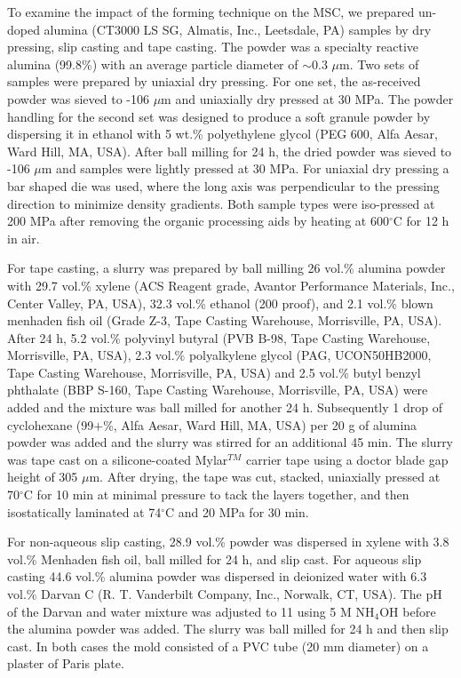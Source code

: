 To examine the impact of the forming technique on the MSC, we prepared un-doped alumina (CT3000 LS SG, Almatis, Inc., Leetsdale, PA) samples by dry pressing, slip casting and tape casting. The powder was a specialty reactive alumina (99.8\%) with an average particle diameter of $\sim$0.3 $\mu$m. Two sets of samples were prepared by uniaxial dry pressing. For one set, the as-received powder was sieved to -106 $\mu$m and uniaxially dry pressed at 30 MPa. The powder handling for the second set was designed to produce a soft granule powder by dispersing it in ethanol with 5 wt.\% polyethylene glycol (PEG 600, Alfa Aesar, Ward Hill, MA, USA). After ball milling for 24 h, the dried powder was sieved to -106 $\mu$m and samples were lightly pressed at 30 MPa. For uniaxial dry pressing a bar shaped die was used, where the long axis was perpendicular to the pressing direction to minimize density gradients. Both sample types were iso-pressed at 200 MPa after removing the organic processing aids by heating at 600$^{\circ}$C for 12 h in air.

For tape casting, a slurry was prepared by ball milling 26 vol.\% alumina powder with 29.7 vol.\% xylene (ACS Reagent grade, Avantor Performance Materials, Inc., Center Valley, PA, USA), 32.3 vol.\% ethanol (200 proof), and 2.1 vol.\% blown menhaden fish oil (Grade Z-3, Tape Casting Warehouse, Morrisville, PA, USA). After 24 h, 5.2 vol.\% polyvinyl butyral (PVB B-98, Tape Casting Warehouse, Morrisville, PA, USA), 2.3 vol.\% polyalkylene glycol (PAG, UCON50HB2000, Tape Casting Warehouse, Morrisville, PA, USA) and 2.5 vol.\% butyl benzyl phthalate (BBP S-160, Tape Casting Warehouse, Morrisville, PA, USA) were added and the mixture was ball milled for another 24 h. Subsequently 1 drop of cyclohexane (99$+$\%, Alfa Aesar, Ward Hill, MA, USA) per 20 g of alumina powder was added and the slurry was stirred for an additional 45 min. The slurry was tape cast on a silicone-coated Mylar$^{TM}$ carrier tape using a doctor blade gap height of 305 $\mu$m. After drying, the tape was cut, stacked, uniaxially pressed at 70$^{\circ}$C for 10 min at minimal pressure to tack the layers together, and then isostatically laminated at 74$^{\circ}$C and 20 MPa for 30 min.

For non-aqueous slip casting, 28.9 vol.\% powder was dispersed in xylene with 3.8 vol.\% Menhaden fish oil, ball milled for 24 h, and slip cast. For aqueous slip casting 44.6 vol.\% alumina powder was dispersed in deionized water with 6.3 vol.\% Darvan C (R. T. Vanderbilt Company, Inc., Norwalk, CT, USA). The pH of the Darvan and water mixture was adjusted to 11 using 5 M NH$_{4}$OH before the alumina powder was added. The slurry was ball milled for 24 h and then slip cast. In both cases the mold consisted of a PVC tube (20 mm diameter) on a plaster of Paris plate.

